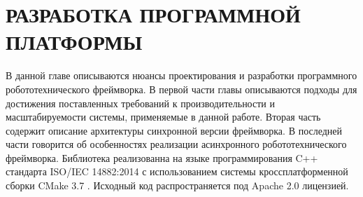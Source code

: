 \chapter{РАЗРАБОТКА ПРОГРАММНОЙ ПЛАТФОРМЫ}

В данной главе описываются нюансы проектирования и разработки программного робототехнического фреймворка. В первой части главы описываются подходы для достижения поставленных требований к производительности и масштабируемости системы, применяемые в данной работе. Вторая часть содержит описание архитектуры синхронной версии фреймворка. В последней части говорится об особенностях реализации асинхронного робототехнического фреймворка. Библиотека реализованна на языке программирования C++ стандарта ISO/IEC 14882:2014 с использованием системы кроссплатформенной сборки CMake 3.7 \cite{martin2015mastering}. Исходный код распространяется под Apache 2.0 \cite{rosen2005open} лицензией.




